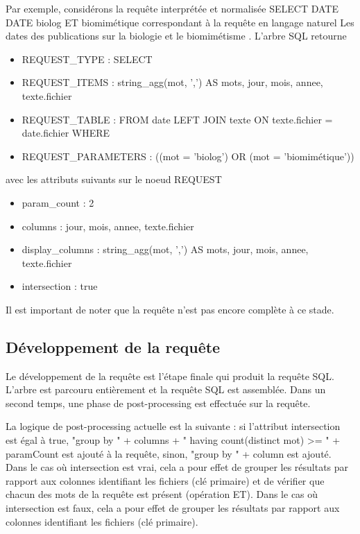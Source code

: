 \documentclass[a4paper]{elsarticle}
\begin{document}
Par exemple, considérons la requête interprétée et normalisée \og SELECT DATE DATE biolog ET biomimétique \fg{} correspondant à la requête en langage naturel \og Les dates des publications sur la biologie et le biomimétisme \fg{}. L'arbre SQL retourne
\begin{itemize}
\item REQUEST\_TYPE : \og SELECT \fg{}
\item REQUEST\_ITEMS : \og string\_agg(mot, ',') AS mots, jour, mois, annee, texte.fichier \fg{}
\item REQUEST\_TABLE : \og FROM date  LEFT JOIN texte ON texte.fichier = date.fichier WHERE \fg{}
\item REQUEST\_PARAMETERS : \og ((mot = 'biolog') OR (mot = 'biomimétique')) \fg{}
\end{itemize}
avec les attributs suivants sur le noeud REQUEST
\begin{itemize}
\item param\_count : 2
\item columns : \og jour, mois, annee, texte.fichier \fg{}
\item display\_columns : \og string\_agg(mot, ',') AS mots, jour, mois, annee, texte.fichier \fg{}
\item intersection : true
\end{itemize}

Il est important de noter que la requête n'est pas encore complète à ce stade.

\subsection{Développement de la requête}

Le développement de la requête est l'étape finale qui produit la requête SQL. L'arbre est parcouru entièrement et la requête SQL est assemblée. Dans un second temps, une phase de post-processing est effectuée sur la requête.

La logique de post-processing actuelle est la suivante : si l'attribut intersection est égal à true, \og "group by " + columns + " having count(distinct mot) >= " + paramCount \fg{} est ajouté à la requête, sinon, \og "group by " + column \fg{} est ajouté. Dans le cas où intersection est vrai, cela a pour effet de grouper les résultats par rapport aux colonnes identifiant les fichiers (clé primaire) et de vérifier que chacun des mots de la requête est présent (opération ET). Dans le cas où intersection est faux, cela a pour effet de grouper les résultats par rapport aux colonnes identifiant les fichiers (clé primaire).
\end{document}
